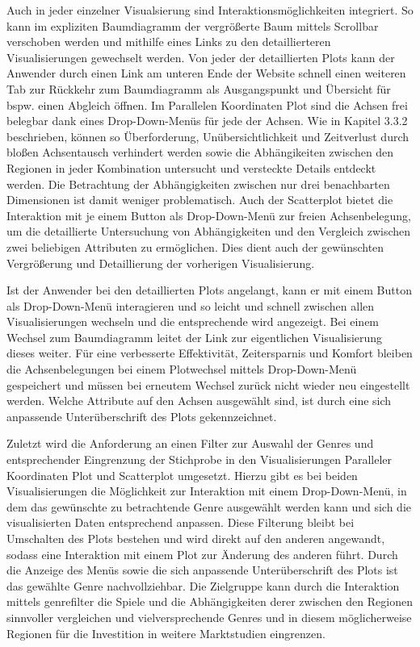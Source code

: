 \documentclass[usegeometry=true]{scrartcl}
\begin{document}
Auch in jeder einzelner Visualsierung sind Interaktionsmöglichkeiten integriert. 
So kann im expliziten Baumdiagramm der vergrößerte Baum mittels Scrollbar verschoben werden und mithilfe eines Links zu den detaillierteren Visualisierungen gewechselt werden.
Von jeder der detaillierten Plots kann der Anwender durch einen Link am unteren Ende der Website schnell einen weiteren Tab zur Rückkehr zum Baumdiagramm als Ausgangspunkt und Übersicht für bspw. einen Abgleich öffnen.
Im Parallelen Koordinaten Plot sind die Achsen frei belegbar dank eines Drop-Down-Menüs für jede der Achsen. 
Wie in Kapitel 3.3.2 beschrieben, können so Überforderung, Unübersichtlichkeit und Zeitverlust durch bloßen Achsentausch verhindert werden sowie die Abhängikeiten zwischen den Regionen in jeder Kombination untersucht und versteckte Details entdeckt werden. 
Die Betrachtung der Abhängigkeiten zwischen nur drei benachbarten Dimensionen ist damit weniger problematisch.
Auch der Scatterplot bietet die Interaktion mit je einem Button als Drop-Down-Menü zur freien Achsenbelegung, um die detaillierte Untersuchung von Abhängigkeiten und den Vergleich zwischen zwei beliebigen Attributen zu ermöglichen.
Dies dient auch der gewünschten Vergrößerung und Detaillierung der vorherigen Visualisierung.

Ist der Anwender bei den detaillierten Plots angelangt, kann er mit einem Button als Drop-Down-Menü interagieren und so leicht und schnell zwischen allen Visualisierungen wechseln und die entsprechende wird angezeigt.
Bei einem Wechsel zum Baumdiagramm leitet der Link zur eigentlichen Visualisierung dieses weiter. 
Für eine verbesserte Effektivität, Zeitersparnis und Komfort bleiben die Achsenbelegungen bei einem Plotwechsel mittels Drop-Down-Menü gespeichert und müssen bei erneutem Wechsel zurück nicht wieder neu eingestellt werden. 
Welche Attribute auf den Achsen ausgewählt sind, ist durch eine sich anpassende Unterüberschrift des Plots gekennzeichnet. 

Zuletzt wird die Anforderung an einen Filter zur Auswahl der Genres und entsprechender Eingrenzung der Stichprobe in den Visualisierungen Paralleler Koordinaten Plot und Scatterplot umgesetzt.
Hierzu gibt es bei beiden Visualisierungen die Möglichkeit zur Interaktion mit einem Drop-Down-Menü, in dem das gewünschte zu betrachtende Genre ausgewählt werden kann und sich die visualisierten Daten entsprechend anpassen.
Diese Filterung bleibt bei Umschalten des Plots bestehen und wird direkt auf den anderen angewandt, sodass eine Interaktion mit einem Plot zur Änderung des anderen führt. 
Durch die Anzeige des Menüs sowie die sich anpassende Unterüberschrift des Plots ist das gewählte Genre nachvollziehbar.
Die Zielgruppe kann durch die Interaktion mittels genrefilter die Spiele und die Abhängigkeiten derer zwischen den Regionen sinnvoller vergleichen und vielversprechende Genres und in diesem möglicherweise Regionen für die Investition in weitere Marktstudien eingrenzen.
\end{document}
